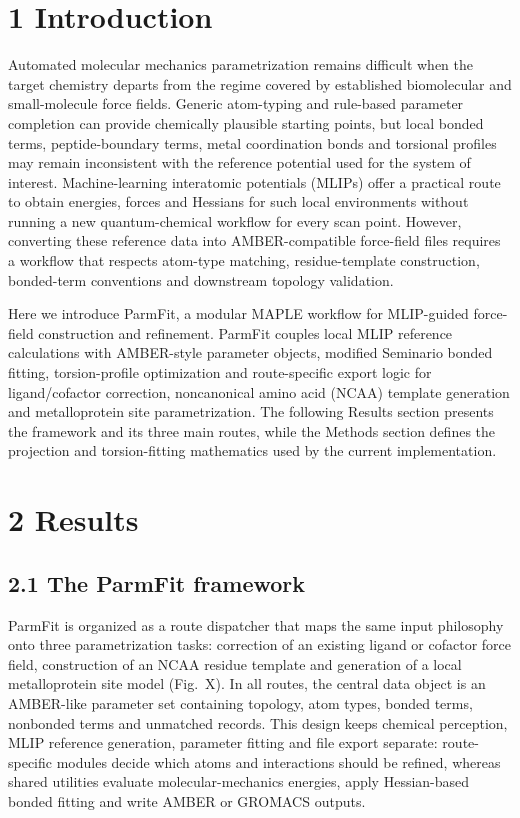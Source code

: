 
\section{1 Introduction}

Automated molecular mechanics parametrization remains difficult when the target chemistry departs from the regime covered by established biomolecular and small-molecule force fields. Generic atom-typing and rule-based parameter completion can provide chemically plausible starting points, but local bonded terms, peptide-boundary terms, metal coordination bonds and torsional profiles may remain inconsistent with the reference potential used for the system of interest. Machine-learning interatomic potentials (MLIPs) offer a practical route to obtain energies, forces and Hessians for such local environments without running a new quantum-chemical workflow for every scan point. However, converting these reference data into AMBER-compatible force-field files requires a workflow that respects atom-type matching, residue-template construction, bonded-term conventions and downstream topology validation.

Here we introduce ParmFit, a modular MAPLE workflow for MLIP-guided force-field construction and refinement. ParmFit couples local MLIP reference calculations with AMBER-style parameter objects, modified Seminario bonded fitting, torsion-profile optimization and route-specific export logic for ligand/cofactor correction, noncanonical amino acid (NCAA) template generation and metalloprotein site parametrization. The following Results section presents the framework and its three main routes, while the Methods section defines the projection and torsion-fitting mathematics used by the current implementation.

\section{2 Results}

\subsection{2.1 The ParmFit framework}

ParmFit is organized as a route dispatcher that maps the same input philosophy onto three parametrization tasks: correction of an existing ligand or cofactor force field, construction of an NCAA residue template and generation of a local metalloprotein site model (Fig.~X). In all routes, the central data object is an AMBER-like parameter set containing topology, atom types, bonded terms, nonbonded terms and unmatched records. This design keeps chemical perception, MLIP reference generation, parameter fitting and file export separate: route-specific modules decide which atoms and interactions should be refined, whereas shared utilities evaluate molecular-mechanics energies, apply Hessian-based bonded fitting and write AMBER or GROMACS outputs.

